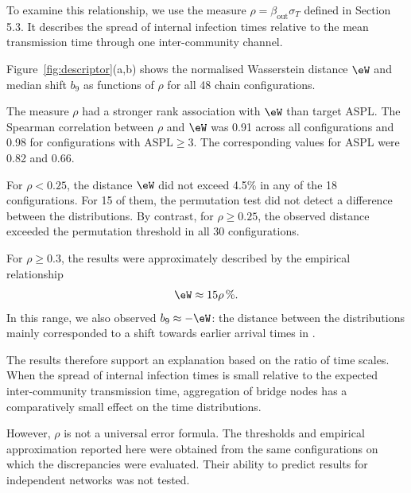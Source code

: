 To examine this relationship, we use the measure $\rho=\beta_{\mathrm{out}}\sigma_T$ defined in Section 5.3. It describes the spread of internal infection times relative to the mean transmission time through one inter-community channel.

Figure~\ref{fig:descriptor}(a,b) shows the normalised Wasserstein distance $\eW$ and median shift $b_9$ as functions of $\rho$ for all 48 chain configurations.

The measure $\rho$ had a stronger rank association with $\eW$ than target ASPL. The Spearman correlation between $\rho$ and $\eW$ was 0.91 across all configurations and 0.98 for configurations with $\mathrm{ASPL}\geq3$. The corresponding values for ASPL were 0.82 and 0.66.

For $\rho<0.25$, the distance $\eW$ did not exceed 4.5\% in any of the 18 configurations. For 15 of them, the permutation test did not detect a difference between the distributions. By contrast, for $\rho\geq0.25$, the observed distance exceeded the permutation threshold in all 30 configurations.

For $\rho\geq0.3$, the results were approximately described by the empirical relationship
\begin{equation}
\eW \approx 15\rho\,\%.
\end{equation}
In this range, we also observed $b_9\approx-\eW$: the distance between the distributions mainly corresponded to a shift towards earlier arrival times in \TS{}.

The results therefore support an explanation based on the ratio of time scales. When the spread of internal infection times is small relative to the expected inter-community transmission time, aggregation of bridge nodes has a comparatively small effect on the time distributions.

However, $\rho$ is not a universal error formula. The thresholds and empirical approximation reported here were obtained from the same configurations on which the discrepancies were evaluated. Their ability to predict results for independent networks was not tested.

